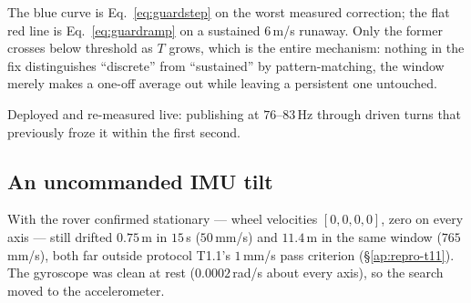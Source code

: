 \begin{center}
\end{center}
The blue curve is Eq.~\ref{eq:guardstep} on the worst measured correction;
the flat red line is Eq.~\ref{eq:guardramp} on a sustained $6$\,m/s runaway.
Only the former crosses below threshold as $T$ grows, which is the entire
mechanism: nothing in the fix distinguishes ``discrete'' from ``sustained''
by pattern-matching, the window merely makes a one-off average out while
leaving a persistent one untouched.

Deployed and re-measured live:  publishing at
$76$--$83$\,Hz through driven turns that previously froze it within the first
second.

\subsection{An uncommanded IMU tilt}
\label{sec:aug05tilt}
With the rover confirmed stationary --- wheel velocities
$[0,0,0,0]$, zero  on every axis --- 
still drifted $0.75$\,m in $15$\,s ($50$\,mm/s) and 
$11.4$\,m in the same window ($765$\,mm/s), both far outside protocol
T1.1's $1$\,mm/s pass criterion (\S\ref{ap:repro-t11}). The gyroscope was
clean at rest ($0.0002$\,rad/s about every axis), so the search moved to the
accelerometer.

